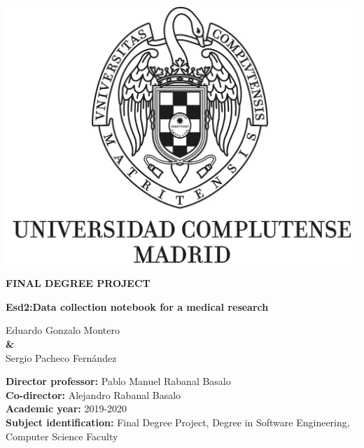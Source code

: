\documentclass{report}
\begin{document}
\begin{titlepage}
        \clearpage
        
        \pagestyle{empty}
 
        \centering
        {\includegraphics[width=1\textwidth]{images/logo_UCM}}
    
        \vspace{1cm}
        
        {\huge\textbf{FINAL DEGREE PROJECT \\ }  }

        \vspace{0.5cm}
        
        {\huge\textbf{Esd2:Data collection notebook for a medical research}}
        
        \vspace{1.4cm}
    
        {\Large Eduardo Gonzalo Montero \\}
        \vspace{0.5cm}
        {\textbf \&\\}
        \vspace{0.5cm}
        {\Large Sergio Pacheco Fernández \\}
        
        \vspace{1.4cm}
        
        \raggedright
        {\Large \textbf{Director professor:} Pablo Manuel Rabanal Basalo \\}
        \vspace{0.1cm}
         {\Large \textbf{Co-director:} Alejandro Rabanal Basalo \\}
        \vspace{0.1cm}
        {\Large\textbf {Academic year:} 2019-2020 \\}
        \vspace{0.1cm}
        {\Large\textbf {Subject identification: }Final Degree Project, Degree in Software Engineering, Computer Science Faculty\\}
    
        \clearpage
     \end{titlepage}
\end{document}
